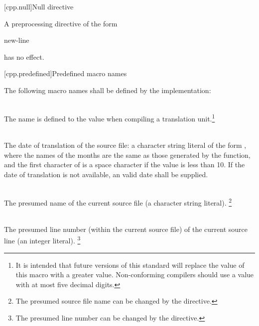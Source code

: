 [cpp.null]{Null directive}%

\pnum
A preprocessing directive of the form

\begin{ncsimplebnf}
\terminal{\#} new-line
\end{ncsimplebnf}

has no effect.

[cpp.predefined]{Predefined macro names}
%

\pnum
The following macro names shall be defined by the implementation:

\begin{description}

%
\item {}\\
The name  is defined
to the value
\tcode{\cppver}
when
compiling a \Cpp translation unit.\footnote{It is intended that future
versions of this standard will
replace the value of this macro with a greater value.
Non-conforming compilers should use a value with at most
five decimal digits.}

%
\item {}\\
The date of translation of the source file:
a character string literal of the form
,
where the names of the months are the same as those generated
by the
function,
and the first character of
is a space character if the value is less than 10.
If the date of translation is not available,
an  valid date
shall be supplied.

%
\item {}\\
The presumed name of the current source file (a character string
literal).%
\footnote{The presumed source file name can be changed by the  directive.}

%
\item {}\\
The presumed line number (within the current source file) of the current source line
(an integer literal).%
\footnote{The presumed line number can be changed by the  directive.}


\end{description}
